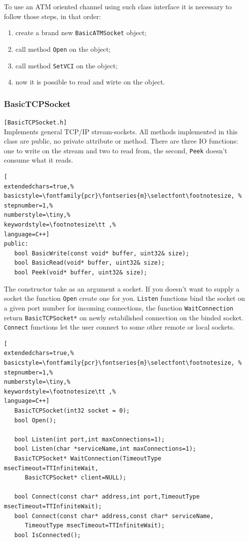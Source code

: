 To use an ATM oriented channel using such class interface it is necessary to follow those steps, in that order:
\begin{enumerate}
 \item create a brand new \texttt{BasicATMSocket} object;
 \item call method \texttt{Open} on the object;
 \item call method \texttt{SetVCI} on the object;
 \item now it is possible to read and wirte on the object.
\end{enumerate}



\subsubsection{BasicTCPSocket}
\texttt{[BasicTCPSocket.h]}\\
Implements general TCP/IP stream-sockets. All methods implemented in this class are public, no private attribute or method. There are three IO functions: one to write on the stream and two to read from, the second, \texttt{Peek} doesn't consume what it reads.

\begin{lstlisting}[
extendedchars=true,%
basicstyle=\fontfamily{pcr}\fontseries{m}\selectfont\footnotesize, %
stepnumber=1,%
numberstyle=\tiny,%
keywordstyle=\footnotesize\tt ,%
language=C++]
public:
   bool BasicWrite(const void* buffer, uint32& size);
   bool BasicRead(void* buffer, uint32& size);
   bool Peek(void* buffer, uint32& size);
\end{lstlisting}

The constructor take as an argument a socket. If you doesn't want to supply a socket the function \texttt{Open} create one for you. \texttt{Listen} functions bind the socket on a given port number for incoming connections, the function \texttt{WaitConnection} return \texttt{BasicTCPSocket*} on newly estabilished connection on the binded socket.
\texttt{Connect} functions let the user connect to some other remote or local sockets.

\begin{lstlisting}[
extendedchars=true,%
basicstyle=\fontfamily{pcr}\fontseries{m}\selectfont\footnotesize, %
stepnumber=1,%
numberstyle=\tiny,%
keywordstyle=\footnotesize\tt ,%
language=C++]
   BasicTCPSocket(int32 socket = 0);
   bool Open();

   bool Listen(int port,int maxConnections=1);
   bool Listen(char *serviceName,int maxConnections=1);
   BasicTCPSocket* WaitConnection(TimeoutType msecTimeout=TTInfiniteWait,
      BasicTCPSocket* client=NULL);

   bool Connect(const char* address,int port,TimeoutType msecTimeout=TTInfiniteWait);
   bool Connect(const char* address,const char* serviceName,
      TimeoutType msecTimeout=TTInfiniteWait);
   bool IsConnected();
\end{lstlisting}

